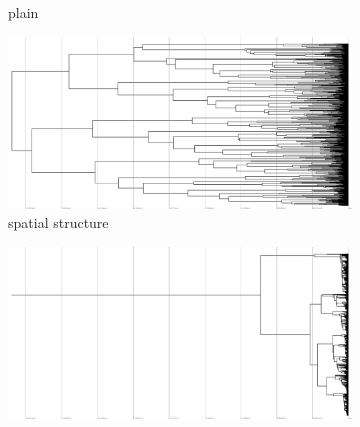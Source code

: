 \begin{figure}
\begin{subfigure}[b]{1\columnwidth}
    \caption{%
      plain}
  \end{subfigure}
  \hfill
  \begin{subfigure}[b]{1\columnwidth}
    \includegraphics[height=0.12\textheight,width=\textwidth]{img/perfect-tree-phylogenies-log/epoch=7+resolution=3+treatment=6/a=collapsed-phylogeny+epoch=00007+mut_distn=np.random.standard_normal+num_generations=32768+num_islands=1024+num_niches=1+p_island_migration=0.01+p_niche_invasion=3.0517578125e-08+population_size=3276.../8+replicate=0+tournament_size=2+treatment=6+_generation=262144+_index=6+scale=log+ext=.pdf}
    \caption{%
      spatial structure}
  \end{subfigure}
  \hfill
  \begin{subfigure}[b]{1\columnwidth}
    \includegraphics[height=0.12\textheight,width=\textwidth]{img/perfect-tree-phylogenies-log/epoch=7+resolution=3+treatment=26/a=collapsed-phylogeny+epoch=00007+mut_distn=np.random.standard_normal+num_generations=32768+num_islands=1+num_niches=4+p_island_migration=0.01+p_niche_invasion=3.0517578125e-06+population_size=32768+r.../eplicate=0+tournament_size=2+treatment=26+_generation=262144+_index=26+scale=log+ext=.pdf}

\end{subfigure}
\end{figure}
